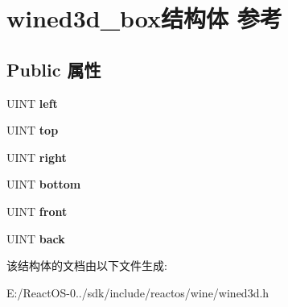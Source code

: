 \hypertarget{structwined3d__box}{}\section{wined3d\+\_\+box结构体 参考}
\label{structwined3d__box}
\subsection*{Public 属性}
\begin{DoxyCompactItemize}
\item 
\mbox{\label{structwined3d__box_a5afcd11f7cb616126a1dfb886f9e19db}} 
U\+I\+NT {\bfseries left}
\item 
\mbox{\label{structwined3d__box_ad7432e23bca21694f4211fe53df97fe4}} 
U\+I\+NT {\bfseries top}
\item 
\mbox{\label{structwined3d__box_a886ebb67c246e5ec2fb3776fb8ebf911}} 
U\+I\+NT {\bfseries right}
\item 
\mbox{\label{structwined3d__box_aca763006d744b407151e65509f7a0654}} 
U\+I\+NT {\bfseries bottom}
\item 
\mbox{\label{structwined3d__box_aaae47e8ee17986d5384cb0f44e4c7c2f}} 
U\+I\+NT {\bfseries front}
\item 
\mbox{\label{structwined3d__box_a95d8241ece11fbc3fa1e7c29a964d41c}} 
U\+I\+NT {\bfseries back}
\end{DoxyCompactItemize}


该结构体的文档由以下文件生成\+:\begin{DoxyCompactItemize}
\item 
E\+:/\+React\+O\+S-\/0../sdk/include/reactos/wine/wined3d.\+h\end{DoxyCompactItemize}
